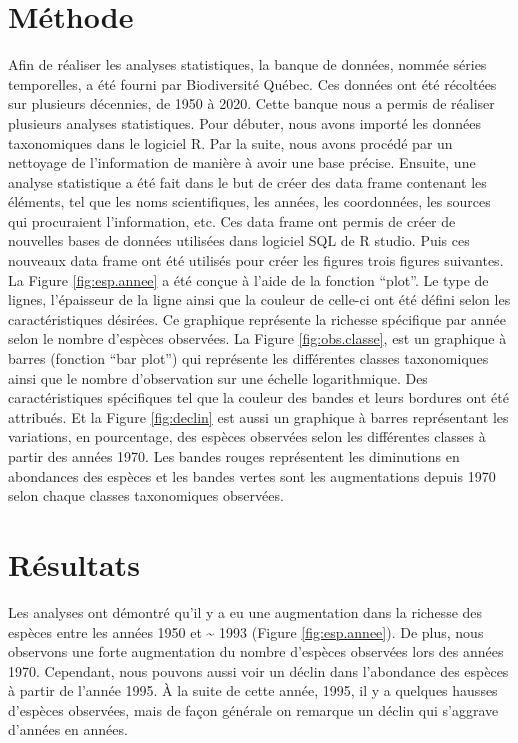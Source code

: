 \documentclass[9pt,twocolumn,twoside,]{pnas-new}
\begin{document}
\section{Méthode}\label{muxe9thode}

Afin de réaliser les analyses statistiques, la banque de données, nommée
séries temporelles, a été fourni par Biodiversité Québec. Ces données
ont été récoltées sur plusieurs décennies, de 1950 à 2020. Cette banque
nous a permis de réaliser plusieurs analyses statistiques. Pour débuter,
nous avons importé les données taxonomiques dans le logiciel R. Par la
suite, nous avons procédé par un nettoyage de l'information de manière à
avoir une base précise. Ensuite, une analyse statistique a été fait dans
le but de créer des data frame contenant les éléments, tel que les noms
scientifiques, les années, les coordonnées, les sources qui procuraient
l'information, etc. Ces data frame ont permis de créer de nouvelles
bases de données utilisées dans logiciel SQL de R studio. Puis ces
nouveaux data frame ont été utilisés pour créer les figures trois
figures suivantes. La Figure \ref{fig:esp.annee} a été conçue à l'aide
de la fonction ``plot''. Le type de lignes, l'épaisseur de la ligne
ainsi que la couleur de celle-ci ont été défini selon les
caractéristiques désirées. Ce graphique représente la richesse
spécifique par année selon le nombre d'espèces observées. La Figure
\ref{fig:obs.classe}, est un graphique à barres (fonction ``bar plot'')
qui représente les différentes classes taxonomiques ainsi que le nombre
d'observation sur une échelle logarithmique. Des caractéristiques
spécifiques tel que la couleur des bandes et leurs bordures ont été
attribués. Et la Figure \ref{fig:declin} est aussi un graphique à barres
représentant les variations, en pourcentage, des espèces observées selon
les différentes classes à partir des années 1970. Les bandes rouges
représentent les diminutions en abondances des espèces et les bandes
vertes sont les augmentations depuis 1970 selon chaque classes
taxonomiques observées.

\section{Résultats}\label{ruxe9sultats}

Les analyses ont démontré qu'il y a eu une augmentation dans la richesse
des espèces entre les années 1950 et \textasciitilde{} 1993 (Figure
\ref{fig:esp.annee}). De plus, nous observons une forte augmentation du
nombre d'espèces observées lors des années 1970. Cependant, nous pouvons
aussi voir un déclin dans l'abondance des espèces à partir de l'année
1995. À la suite de cette année, 1995, il y a quelques hausses d'espèces
observées, mais de façon générale on remarque un déclin qui s'aggrave
d'années en années.
\end{document}
